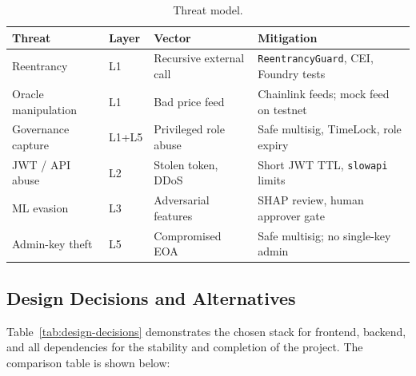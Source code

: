 \begin{table}[H]
\centering
\caption[Threat model]{Threat model.}
\label{tab:threat-model}
\footnotesize
\begin{tabular}{@{}p{2.4cm}p{1.0cm}p{3.2cm}p{6.8cm}@{}}
\toprule
\tableheadcolor
\textbf{Threat} & \textbf{Layer} & \textbf{Vector} & \textbf{Mitigation} \\
\midrule
Reentrancy & L1 & Recursive external call & \texttt{ReentrancyGuard}, CEI, Foundry tests \\
Oracle manipulation & L1 & Bad price feed & Chainlink feeds; mock feed on testnet \\
Governance capture & L1+L5 & Privileged role abuse & Safe multisig, TimeLock, role expiry \\
JWT / API abuse & L2 & Stolen token, DDoS & Short JWT TTL, \texttt{slowapi} limits \\
ML evasion & L3 & Adversarial features & SHAP review, human approver gate \\
Admin-key theft & L5 & Compromised EOA & Safe multisig; no single-key admin \\
\bottomrule
\end{tabular}
\end{table}




\subsection{Design Decisions and Alternatives}

Table~\ref{tab:design-decisions} demonstrates the chosen stack for frontend, backend, and all dependencies for the stability and completion of the project. The comparison table is shown below:

